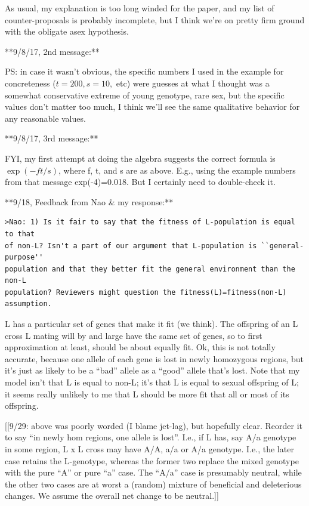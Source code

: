 \documentclass{article}\usepackage[]{graphicx}\usepackage[]{color}
\begin{document}
As usual, my explanation is too long winded for the paper, and my list of counter-proposals is
probably incomplete, but I think we’re on pretty firm ground with the obligate asex hypothesis.

**9/8/17, 2nd message:**

PS: in case it wasn’t obvious, the specific numbers I used in the example for concreteness
($t=200, s=10,$ etc) were guesses at what I thought was a somewhat conservative extreme of young
genotype, rare sex, but the specific values don’t matter too much, I think we’ll see the same
qualitative behavior for any reasonable values.

**9/8/17, 3rd message:**

FYI, my first attempt at doing the algebra suggests the correct formula is $\exp(-ft/s)$, where f,
t, and s are as above.  E.g., using the example numbers from that message exp(-4)=0.018.  But I
certainly need to double-check it.

**9/18, Feedback from Nao \& my response:**


\begin{verbatim}
>Nao: 1) Is it fair to say that the fitness of L-population is equal to that
of non-L? Isn't a part of our argument that L-population is ``general-purpose''
population and that they better fit the general environment than the non-L
population? Reviewers might question the fitness(L)=fitness(non-L) assumption. 
\end{verbatim}

L has a particular set of genes that make it fit (we think).  The offspring of an L cross L mating
will by and large have the same set of genes, so to first approximation at least, should be about
equally fit.  Ok, this is not totally accurate, because one allele of each gene is lost in newly
homozygous regions, but it’s just as likely to be a “bad” allele as a “good” allele that’s lost.
Note that my model isn’t that L is equal to non-L; it’s that L is equal to sexual offspring of L; it
seems really unlikely to me that L should be more fit that all or most of its offspring.

[[9/29: above was poorly worded (I blame jet-lag), but hopefully clear.  Reorder it to say ``in
newly hom regions, one allele is lost''.  I.e., if L has, say A/a genotype in some region, L x L
cross may have A/A, a/a or A/a genotype.  I.e., the later case retains the L-genotype, whereas the
former two replace the mixed genotype with the pure ``A'' or pure ``a'' case.  The ``A/a'' case is
presumably neutral, while the other two cases are at worst a (random) mixture of beneficial and
deleterious changes.  We assume the overall net change to be neutral.]]
\end{document}
